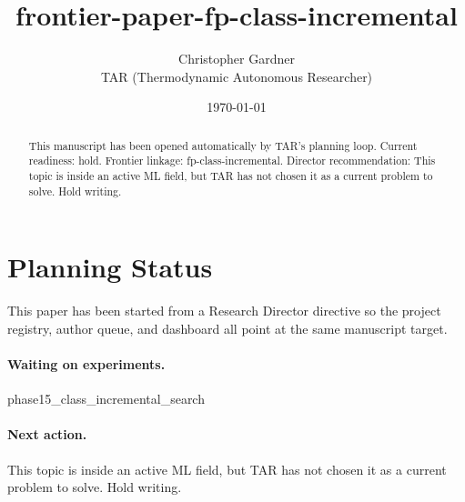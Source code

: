 \documentclass[11pt]{article}
\title{frontier-paper-fp-class-incremental}
\author{Christopher Gardner \\ TAR (Thermodynamic Autonomous Researcher)}
\date{\today}
\begin{document}
\maketitle

\begin{abstract}
This manuscript has been opened automatically by TAR's planning loop.
Current readiness: hold. Frontier linkage: fp-class-incremental.
Director recommendation: This topic is inside an active ML field, but TAR has not chosen it as a current problem to solve. Hold writing.
\end{abstract}

\section{Planning Status}
This paper has been started from a Research Director directive so the project registry,
author queue, and dashboard all point at the same manuscript target.

\paragraph{Waiting on experiments.}
phase15\_class\_incremental\_search

\paragraph{Next action.}
This topic is inside an active ML field, but TAR has not chosen it as a current problem to solve. Hold writing.
\end{document}
